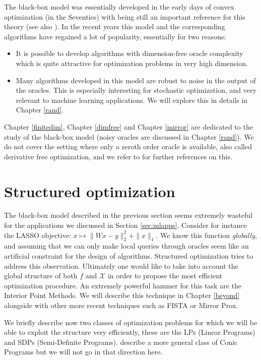 \documentclass[openany]{now}
\newcommand{\cX}{\mathcal{X}}
\begin{document}
The black-box model was essentially developed in the early days of convex optimization (in the Seventies) with \cite{NY83} being still an important reference for this theory (see also \cite{Nem95}). In the recent years this model and the corresponding algorithms have regained a lot of popularity, essentially for two reasons:
\begin{itemize}
\item It is possible to develop algorithms with dimension-free oracle complexity which is quite attractive for optimization problems in very high dimension.
\item Many algorithms developed in this model are robust to noise in the output of the oracles. This is especially interesting for stochastic optimization, and very relevant to machine learning applications. We will explore this in details in Chapter \ref{rand}.
\end{itemize}
Chapter \ref{finitedim}, Chapter \ref{dimfree} and Chapter \ref{mirror} are dedicated to the study of the black-box model (noisy oracles are discussed in Chapter \ref{rand}). We do not cover the setting where only a zeroth order oracle is available, also called derivative free optimization, and we refer to \cite{CSV09, ABM11} for further references on this.

\section{Structured optimization} \label{sec:structured}
The black-box model described in the previous section seems extremely wasteful for the applications we discussed in Section \ref{sec:mlapps}. Consider for instance the LASSO objective: $x \mapsto \|W x - y\|_2^2 + \|x\|_1$. We know this function {\em globally}, and assuming that we can only make local queries through oracles seem like an artificial constraint for the design of algorithms. Structured optimization tries to address this observation. Ultimately one would like to take into account the global structure of both $f$ and $\cX$ in order to propose the most efficient optimization procedure. An extremely powerful hammer for this task are the Interior Point Methods. We will describe this technique in Chapter \ref{beyond} alongside with other more recent techniques such as FISTA or Mirror Prox. 

We briefly describe now two classes of optimization problems for which we will be able to exploit the structure very efficiently, these are the LPs (Linear Programs) and SDPs (Semi-Definite Programs). \cite{BN01} describe a more general class of Conic Programs but we will not go in that direction here.
\end{document}
